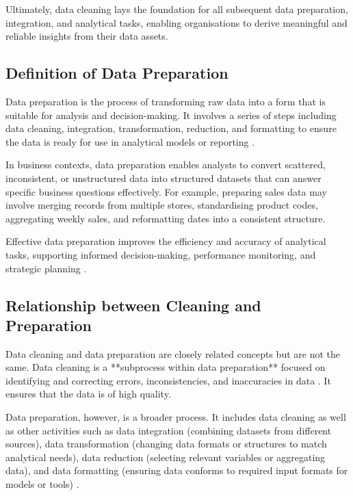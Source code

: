 Ultimately, data cleaning lays the foundation for all subsequent data preparation, integration, and analytical tasks, enabling organisations to derive meaningful and reliable insights from their data assets.

\subsection{Definition of Data Preparation}

Data preparation is the process of transforming raw data into a form that is suitable for analysis and decision-making. It involves a series of steps including data cleaning, integration, transformation, reduction, and formatting to ensure the data is ready for use in analytical models or reporting \cite{pyle1999data}.

In business contexts, data preparation enables analysts to convert scattered, inconsistent, or unstructured data into structured datasets that can answer specific business questions effectively. For example, preparing sales data may involve merging records from multiple stores, standardising product codes, aggregating weekly sales, and reformatting dates into a consistent structure.

Effective data preparation improves the efficiency and accuracy of analytical tasks, supporting informed decision-making, performance monitoring, and strategic planning \cite{zeller2014data}.

\subsection{Relationship between Cleaning and Preparation}

Data cleaning and data preparation are closely related concepts but are not the same. Data cleaning is a **subprocess within data preparation** focused on identifying and correcting errors, inconsistencies, and inaccuracies in data \cite{kelleher2015fundamentals}. It ensures that the data is of high quality.

Data preparation, however, is a broader process. It includes data cleaning as well as other activities such as data integration (combining datasets from different sources), data transformation (changing data formats or structures to match analytical needs), data reduction (selecting relevant variables or aggregating data), and data formatting (ensuring data conforms to required input formats for models or tools) \cite{han2011data}.

